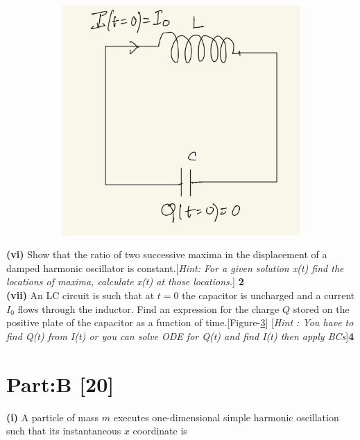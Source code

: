 \documentclass[12pt, a4paper]{article}
\begin{document}
{\begin{figure}[t]
\begin{subfigure}{.5\textwidth}
        \caption{}
        \label{fig:compound-pend}
    \end{subfigure}
    \begin{subfigure}{.2\textwidth}
        \centering
        \includegraphics*[scale=0.13]{figs/LC-circuit.jpeg}
        \caption{}
        \label{fig:LC-circuit}
    \end{subfigure}
\end{figure}
\noindent
\textbf{(vi)} Show that the ratio of two successive maxima in the displacement of a damped harmonic
oscillator is constant.[\textit{Hint: For a given solution x(t) find the locations of maxima, calculate x(t) 
at those locations.}]
\hfill \textbf{2}\\

\noindent
\textbf{(vii)} An LC circuit is such that at $t=0$ the capacitor is uncharged and a current $I_0$ flows through 
the inductor. Find an expression for the charge $Q$ stored on the positive plate of the capacitor 
as a function of time.[Figure-\ref{fig:LC-circuit}] [\textit{Hint : You have to find Q(t) from I(t) or you can 
solve ODE for Q(t) and find I(t) then apply BCs}]\hfill \textbf{4}\\


\section*{Part:B \hfill \textbf{[20]}}
\textbf{(i)} A particle of mass $m$ executes one-dimensional simple harmonic oscillation such 
that its instantaneous $x$ coordinate is

}
\end{document}
